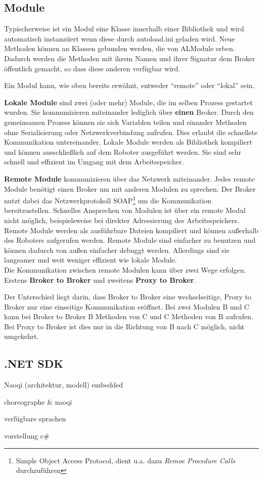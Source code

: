 \subsection{Module}
Typischerweise ist ein Modul eine Klasse innerhalb einer Bibliothek und wird automatisch instanziiert wenn diese  durch \textsf{autoload.ini} geladen wird. Neue Methoden können an Klassen gebunden werden, die von \textsf{ALModule} erben. Dadurch werden die Methoden mit ihrem Namen und ihrer Signatur dem Broker öffentlich gemacht, so dass diese anderen verfügbar wird.

Ein Modul kann, wie oben bereits erwähnt, entweder "`remote"' oder "`lokal"' sein. 

\textbf{Lokale Module } sind zwei (oder mehr) Module, die im selben Prozess gestartet wurden. Sie kommunizieren miteinander lediglich über \textbf{einen} Broker. Durch den gemeinsamen Prozess können sie sich  Variablen teilen und einander Methoden ohne Serialisierung oder Netzwerkverbindung aufrufen. Dies erlaubt die schnellste Kommunikation untereinander. Lokale Module werden als Bibliothek kompiliert und können ausschließlich auf dem Roboter ausgeführt werden. Sie sind sehr schnell und effizient im Umgang mit dem Arbeitsspeicher.

\textbf{Remote Module} kommunizieren über das Netzwerk miteinander. Jedes remote Module benötigt einen Broker um mit anderen Modulen zu sprechen. Der Broker nutzt dabei das Netzwerkprotokoll SOAP\footnote{Simple Object Access Protocol, dient u.a. dazu \textit{Remoe Procedure Calls} durchzuführen} um die Kommunikation bereitzustellen. Schnelles Ansprechen von Modulen ist über ein remote Modul nicht möglich, beispielsweise bei direkter Adressierung des Arbeitsspeichers. Remote Module werden als ausführbare Dateien kompiliert und können außerhalb des Roboters aufgerufen werden. Remote Module sind einfacher zu benutzen und können dadurch von außen einfacher debuggt werden. Allerdings sind sie langsamer und weit weniger effizient wie lokale Module. 
\\
Die Kommunikation zwischen remote Modulen kann über zwei Wege erfolgen. Erstens \textbf{Broker to Broker} und zweitens \textbf{Proxy to Broker}.
 
Der Unterschied liegt darin, dass Broker to Broker eine wechselseitige, Proxy to Broker nur eine einseitige Kommunikation eröffnet. Bei zwei Modulen B und C kann bei Broker to Broker B Methoden von C und C Methoden von B aufrufen. Bei Proxy to Broker ist dies nur in die Richtung von B nach C möglich, nicht umgekehrt.
	

\subsection{.NET SDK}

Naoqi (architektur, modell)
	embedded
	
choreographe \& naoqi	


verfügbare sprachen


vorstellung c\#